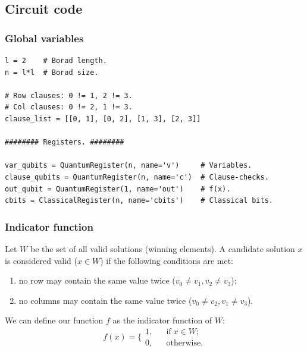 \documentclass{article}
\begin{document}
\subsection{Circuit code}
\subsubsection{Global variables}
\begin{verbatim}
l = 2    # Borad length.
n = l*l  # Borad size.

# Row clauses: 0 != 1, 2 != 3.
# Col clauses: 0 != 2, 1 != 3.
clause_list = [[0, 1], [0, 2], [1, 3], [2, 3]]

######## Registers. ########

var_qubits = QuantumRegister(n, name='v')     # Variables.
clause_qubits = QuantumRegister(n, name='c')  # Clause-checks.
out_qubit = QuantumRegister(1, name='out')    # f(x).
cbits = ClassicalRegister(n, name='cbits')    # Classical bits.
\end{verbatim}

\subsubsection{Indicator function}
Let $W$ be the set of all valid
solutions (winning elements).
A candidate solution $x$ is considered valid ($x \in W$) if
the following conditions are met:
\begin{enumerate}
  \item
  no row may contain the same value twice ($v_0 \neq v_1, v_2 \neq v_3$);
  \item
  no columns may contain the same value twice ($v_0 \neq v_2, v_1 \neq v_3$).
\end{enumerate}
We can define our function $f$ as the indicator function of $W$:
\[
  f(x) = \bigg\{
  \begin{aligned}
    1, && \text{if} \; x \in W; \\
    0, && \text{otherwise}.
  \end{aligned}
\]
\end{document}
